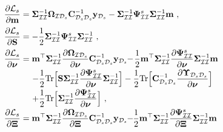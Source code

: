 \documentclass[conference]{IEEEtran}
\begin{document}
		\begin{equation*}
			\hspace{-1.7mm}
			\begin{array}{l}
				\displaystyle\dfrac{\partial{\mathcal{L}}_s}{\partial\mathbf{m}}=\mathbf{\Sigma}_\mathcal{II}^{-1}\mathbf{\Omega}_{\mathcal{I}\mathcal{D}_s}\mathbf{C}_{\mathcal{D}_s\mathcal{D}_s}^{-1}\mathbf{y}_{\mathcal{D}_s}-\mathbf{\Sigma}_\mathcal{II}^{-1}\mathbf{\Psi}_\mathcal{II}^{s}\mathbf{\Sigma}_\mathcal{II}^{-1}\mathbf{m}\ ,\vspace{2mm}\\
				\displaystyle\dfrac{\partial{\mathcal{L}}_s}{\partial\mathbf{S}}=-\dfrac{1}{2}\mathbf{\Sigma}_\mathcal{II}^{-1}\mathbf{\Psi}_\mathcal{II}^{s}\mathbf{\Sigma}_\mathcal{II}^{-1}\ ,\vspace{2mm}\\
				\displaystyle\dfrac{\partial{\mathcal{L}}_s}{\partial\boldsymbol{\nu}}=\mathbf{m}^\top\mathbf{\Sigma}_\mathcal{II}^{-1}\dfrac{\partial\mathbf{\Omega}_{\mathcal{I}\mathcal{D}_s}}{\partial\boldsymbol{\nu}}\mathbf{C}_{\mathcal{D}_s\mathcal{D}_s}^{-1}\mathbf{y}_{\mathcal{D}_s}\hspace{-1mm}-\hspace{-0.5mm}\frac{1}{2}\mathbf{m}^\top\mathbf{\Sigma}_\mathcal{II}^{-1}\dfrac{\partial\mathbf{\Psi}_\mathcal{II}^{s}}{\partial\boldsymbol{\nu}}\mathbf{\Sigma}_\mathcal{II}^{-1}\mathbf{m}\vspace{1mm}\\
				\displaystyle\qquad\quad\ -\frac{1}{2}\mathrm{Tr}\Big[\mathbf{S}\mathbf{\Sigma}_\mathcal{II}^{-1}\dfrac{\partial\mathbf{\Psi}_\mathcal{II}^{s}}{\partial\boldsymbol{\nu}}\mathbf{\Sigma}_\mathcal{II}^{-1}\Big]-\frac{1}{2}\mathrm{Tr}\Big[\mathbf{C}_{\mathcal{D}_s\mathcal{D}_s}^{-1}\dfrac{\partial\mathbf{\Upsilon}_{\mathcal{D}_s\mathcal{D}_s}}{\partial\boldsymbol{\nu}}\Big]\vspace{1mm}\\
				\displaystyle\qquad\quad\ + \frac{1}{2}\mathrm{Tr}\Big[\mathbf{\Sigma}_\mathcal{II}^{-1}\dfrac{\partial\mathbf{\Psi}_\mathcal{II}^{s}}{\partial\boldsymbol{\nu}}\Big]\ ,\vspace{1mm}\\
				\displaystyle\dfrac{\partial{\mathcal{L}}_s}{\partial\mathbf{\Xi}}=\mathbf{m}^\top\mathbf{\Sigma}_\mathcal{II}^{-1}\dfrac{\partial\mathbf{\Omega}_{\mathcal{I}\mathcal{D}_s}}{\partial\mathbf{\Xi}}\mathbf{C}_{\mathcal{D}_s\mathcal{D}_s}^{-1}\mathbf{y}_{\mathcal{D}_s}\hspace{-1mm}-\hspace{-1mm}\frac{1}{2}\mathbf{m}^\top\mathbf{\Sigma}_\mathcal{II}^{-1}\dfrac{\partial\mathbf{\Psi}_\mathcal{II}^{s}}{\partial\mathbf{\Xi}}\mathbf{\Sigma}_\mathcal{II}^{-1}\mathbf{m}\vspace{1mm}\\

\end{array}
\end{equation*}
\end{document}

